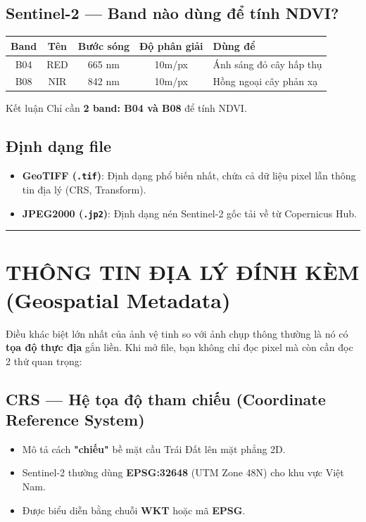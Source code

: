 \documentclass[12pt,a4paper]{report}
\begin{document}
\subsection{Sentinel-2 — Band nào dùng để tính NDVI?}
\begin{table}[H]
\centering
\begin{tabularx}{\textwidth}{|c|c|c|c|X|}
\hline
\rowcolor{blue!80!black}
{\color{white}\textbf{Band}} & {\color{white}\textbf{Tên}} & {\color{white}\textbf{Bước sóng}} & {\color{white}\textbf{Độ phân giải}} & {\color{white}\textbf{Dùng để}} \\
\hline
B04 & RED & 665 nm & 10m/px & Ánh sáng đỏ cây hấp thụ \\
\hline
B08 & NIR & 842 nm & 10m/px & Hồng ngoại cây phản xạ \\
\hline
\end{tabularx}
\end{table}

\begin{resultbox}{Kết luận}
Chỉ cần \textbf{2 band: B04 và B08} để tính NDVI.
\end{resultbox}

\subsection{Định dạng file}
\begin{itemize}
    \item \textbf{GeoTIFF (\texttt{.tif})}: Định dạng phổ biến nhất, chứa cả dữ liệu pixel lẫn thông tin địa lý (CRS, Transform).
    \item \textbf{JPEG2000 (\texttt{.jp2})}: Định dạng nén Sentinel-2 gốc tải về từ Copernicus Hub.
\end{itemize}

\noindent\rule{\textwidth}{0.4pt}

\section{THÔNG TIN ĐỊA LÝ ĐÍNH KÈM (Geospatial Metadata)}

Điều khác biệt lớn nhất của ảnh vệ tinh so với ảnh chụp thông thường là nó có \textbf{tọa độ thực địa} gắn liền. Khi mở file, bạn không chỉ đọc pixel mà còn cần đọc 2 thứ quan trọng:

\subsection{CRS — Hệ tọa độ tham chiếu (Coordinate Reference System)}
\begin{itemize}
    \item Mô tả cách \textbf{"chiếu"} bề mặt cầu Trái Đất lên mặt phẳng 2D.
    \item Sentinel-2 thường dùng \textbf{EPSG:32648} (UTM Zone 48N) cho khu vực Việt Nam.
    \item Được biểu diễn bằng chuỗi \textbf{WKT} hoặc mã \textbf{EPSG}.
\end{itemize}
\end{document}
